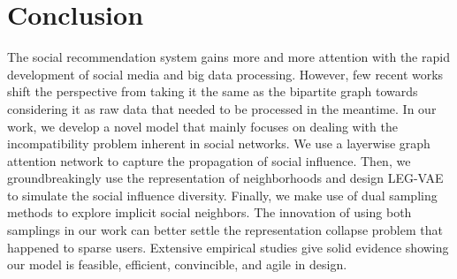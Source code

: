\documentclass[letterpaper]{article} %
\begin{document}
\section{Conclusion}
The social recommendation system gains more and more attention with the rapid development of social media and big data processing. However, few recent works shift the perspective from taking it the same as the bipartite graph towards considering it as raw data that needed to be processed in the meantime. In our work, we develop a novel model that mainly focuses on dealing with the incompatibility problem inherent in social networks. We use a layerwise graph attention network to capture the propagation of social influence. Then, we groundbreakingly use the representation of neighborhoods and design LEG-VAE to simulate the social influence diversity. Finally, we make use of dual sampling methods to explore implicit social neighbors. The innovation of using both samplings in our work can better settle the representation collapse problem that happened to sparse users. Extensive empirical studies give solid evidence showing our model is feasible, efficient, convincible, and agile in design.


\end{document}
